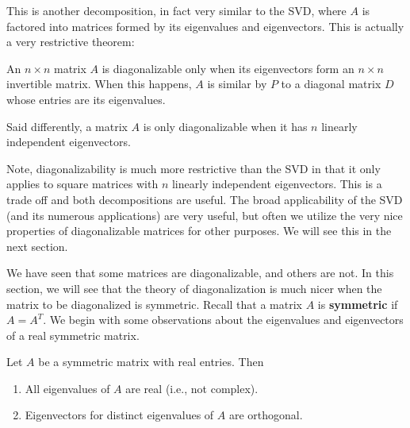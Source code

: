 \documentclass{ximera}
\begin{document}
This is another decomposition, in fact very similar to the SVD, where $A$ is factored into matrices formed by its eigenvalues and eigenvectors. This is actually a very restrictive theorem:

\begin{theorem}

  An $n\times n$ matrix $A$ is diagonalizable only when its eigenvectors form an $n\times n$ invertible matrix. When this happens, $A$ is similar by $P$ to a diagonal matrix $D$ whose entries are its eigenvalues.

  Said differently, a matrix $A$ is only diagonalizable when it has $n$ linearly independent eigenvectors.

\end{theorem}

Note, diagonalizability is much more restrictive than the SVD in that it only applies to square matrices with $n$ linearly independent eigenvectors. This is a trade off and both decompositions are useful. The broad applicability of the SVD (and its numerous applications) are very useful, but often we utilize the very nice properties of diagonalizable matrices for other purposes. We will see this in the next section. 

We have seen that some matrices are diagonalizable, and others are not. In this section, we will see that
the theory of diagonalization is much nicer when the matrix to be
diagonalized is symmetric. Recall that a matrix $A$ is
\textbf{symmetric}%
%
 if $A=A^T$. We begin with some observations
about the eigenvalues and eigenvectors of a real symmetric matrix.

\begin{proposition}
  Let $A$ be a symmetric matrix with real entries. Then

    \begin{enumerate}
    \item All eigenvalues of $A$ are real (i.e., not complex).
    \item Eigenvectors for distinct eigenvalues of $A$ are orthogonal.
    \end{enumerate}

\end{proposition}
\end{document}
